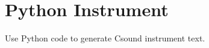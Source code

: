 \section{Python Instrument}\label{pythonInstrument}

Use Python code to generate Csound instrument text.
